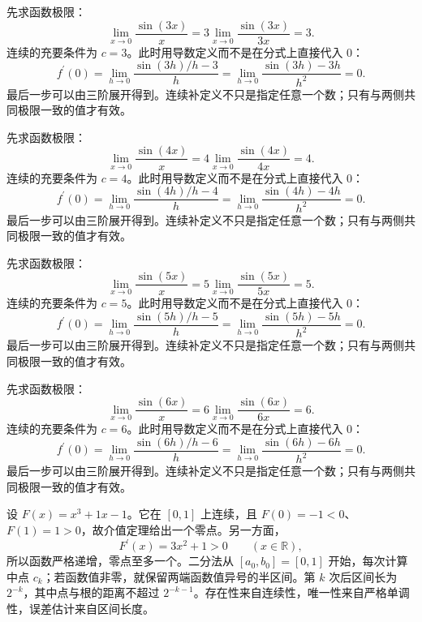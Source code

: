 \documentclass[12pt,fontset=fandol]{ctexart}
\begin{document}
\begin{solve}\label{ans:c6q3}
先求函数极限：
\[
\lim_{x\to0}\frac{\sin(3x)}x=3\lim_{x\to0}\frac{\sin(3x)}{3x}=3.
\]
连续的充要条件为 $c=3$。此时用导数定义而不是在分式上直接代入 $0$：
\[
f^{\prime}(0)=\lim_{h\to0}\frac{\sin(3h)/h-3}h=\lim_{h\to0}\frac{\sin(3h)-3h}{h^2}=0.
\]
最后一步可以由三阶展开得到。连续补定义不只是指定任意一个数；只有与两侧共同极限一致的值才有效。
\end{solve}

\begin{solve}\label{ans:c6q4}
先求函数极限：
\[
\lim_{x\to0}\frac{\sin(4x)}x=4\lim_{x\to0}\frac{\sin(4x)}{4x}=4.
\]
连续的充要条件为 $c=4$。此时用导数定义而不是在分式上直接代入 $0$：
\[
f^{\prime}(0)=\lim_{h\to0}\frac{\sin(4h)/h-4}h=\lim_{h\to0}\frac{\sin(4h)-4h}{h^2}=0.
\]
最后一步可以由三阶展开得到。连续补定义不只是指定任意一个数；只有与两侧共同极限一致的值才有效。
\end{solve}

\begin{solve}\label{ans:c6q5}
先求函数极限：
\[
\lim_{x\to0}\frac{\sin(5x)}x=5\lim_{x\to0}\frac{\sin(5x)}{5x}=5.
\]
连续的充要条件为 $c=5$。此时用导数定义而不是在分式上直接代入 $0$：
\[
f^{\prime}(0)=\lim_{h\to0}\frac{\sin(5h)/h-5}h=\lim_{h\to0}\frac{\sin(5h)-5h}{h^2}=0.
\]
最后一步可以由三阶展开得到。连续补定义不只是指定任意一个数；只有与两侧共同极限一致的值才有效。
\end{solve}

\begin{solve}\label{ans:c6q6}
先求函数极限：
\[
\lim_{x\to0}\frac{\sin(6x)}x=6\lim_{x\to0}\frac{\sin(6x)}{6x}=6.
\]
连续的充要条件为 $c=6$。此时用导数定义而不是在分式上直接代入 $0$：
\[
f^{\prime}(0)=\lim_{h\to0}\frac{\sin(6h)/h-6}h=\lim_{h\to0}\frac{\sin(6h)-6h}{h^2}=0.
\]
最后一步可以由三阶展开得到。连续补定义不只是指定任意一个数；只有与两侧共同极限一致的值才有效。
\end{solve}

\begin{solve}\label{ans:c6q7}
设 $F(x)=x^3+1x-1$。它在 $[0,1]$ 上连续，且 $F(0)=-1<0$、$F(1)=1>0$，故介值定理给出一个零点。另一方面，
\[
F^{\prime}(x)=3x^2+1>0\qquad(x\in\mathbb R),
\]
所以函数严格递增，零点至多一个。二分法从 $[a_0,b_0]=[0,1]$ 开始，每次计算中点 $c_k$；若函数值非零，就保留两端函数值异号的半区间。第 $k$ 次后区间长为 $2^{-k}$，其中点与根的距离不超过 $2^{-k-1}$。存在性来自连续性，唯一性来自严格单调性，误差估计来自区间长度。
\end{solve}
\end{document}
